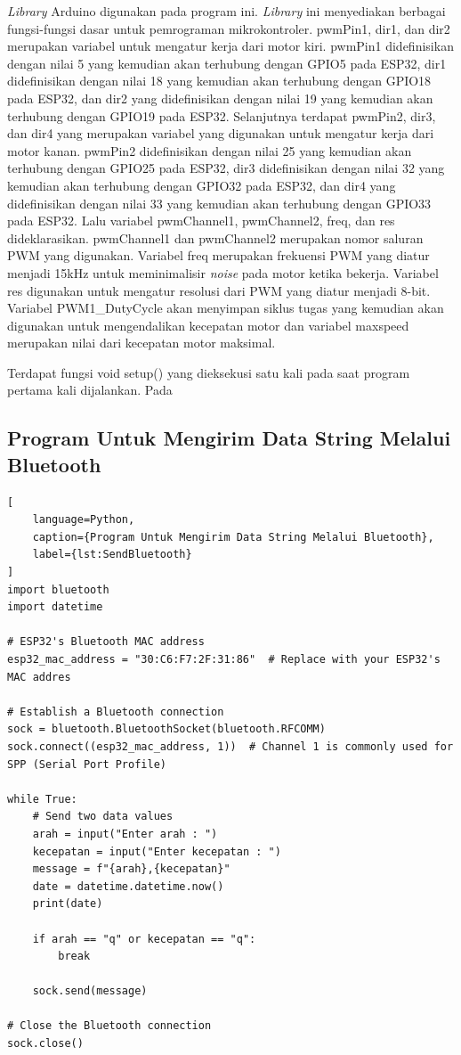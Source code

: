 \emph{Library} Arduino digunakan pada program ini. \emph{Library} ini menyediakan berbagai fungsi-fungsi dasar untuk pemrograman mikrokontroler. pwmPin1, dir1, dan dir2 merupakan variabel untuk mengatur kerja dari motor kiri. pwmPin1 didefinisikan dengan nilai 5 yang kemudian akan terhubung dengan GPIO5 pada ESP32, dir1 didefinisikan dengan nilai 18 yang kemudian akan terhubung dengan GPIO18 pada ESP32, dan dir2 yang didefinisikan dengan nilai 19 yang kemudian akan terhubung dengan GPIO19 pada ESP32. Selanjutnya terdapat pwmPin2, dir3, dan dir4 yang merupakan variabel yang digunakan untuk mengatur kerja dari motor kanan. pwmPin2 didefinisikan dengan nilai 25 yang kemudian akan terhubung dengan GPIO25 pada ESP32, dir3 didefinisikan dengan nilai 32 yang kemudian akan terhubung dengan GPIO32 pada ESP32, dan dir4 yang didefinisikan dengan nilai 33 yang kemudian akan terhubung dengan GPIO33 pada ESP32. Lalu variabel pwmChannel1, pwmChannel2, freq, dan res dideklarasikan. pwmChannel1 dan pwmChannel2 merupakan nomor saluran PWM yang digunakan. Variabel freq merupakan frekuensi PWM yang diatur menjadi 15kHz untuk meminimalisir \emph{noise} pada motor ketika bekerja. Variabel res digunakan untuk mengatur resolusi dari PWM yang diatur menjadi 8-bit. Variabel PWM1\_DutyCycle akan menyimpan siklus tugas yang kemudian akan digunakan untuk mengendalikan kecepatan motor dan variabel maxspeed merupakan nilai dari kecepatan motor maksimal.

Terdapat fungsi void setup() yang dieksekusi satu kali pada saat program pertama kali dijalankan. Pada 


\subsection{Program Untuk Mengirim Data String Melalui Bluetooth}

\begin{lstlisting}[
    language=Python,
    caption={Program Untuk Mengirim Data String Melalui Bluetooth},
    label={lst:SendBluetooth}
]
import bluetooth
import datetime

# ESP32's Bluetooth MAC address
esp32_mac_address = "30:C6:F7:2F:31:86"  # Replace with your ESP32's MAC addres

# Establish a Bluetooth connection
sock = bluetooth.BluetoothSocket(bluetooth.RFCOMM)
sock.connect((esp32_mac_address, 1))  # Channel 1 is commonly used for SPP (Serial Port Profile)

while True:
    # Send two data values
    arah = input("Enter arah : ")
    kecepatan = input("Enter kecepatan : ")
    message = f"{arah},{kecepatan}"
    date = datetime.datetime.now()
    print(date)
    
    if arah == "q" or kecepatan == "q":
        break
    
    sock.send(message)

# Close the Bluetooth connection
sock.close()

\end{lstlisting}

